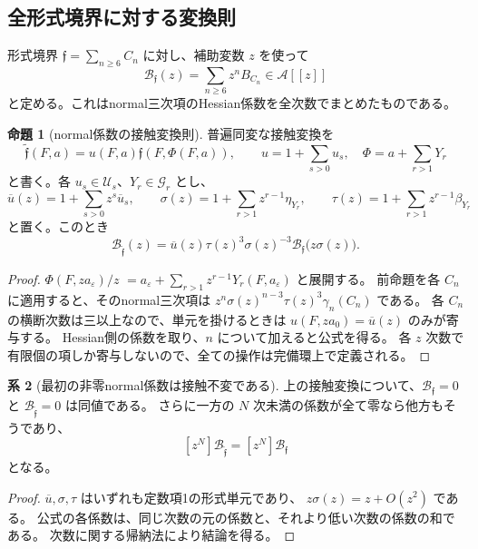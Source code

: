 \documentclass[a4paper,11pt]{ltjsarticle}
\theoremstyle{definition}
\newtheorem{theorem}{命題}[section]
\newtheorem{corollary}[theorem]{系}
\begin{document}
\subsection{全形式境界に対する変換則}

形式境界 $\mathfrak f=\sum_{n\ge6}C_n$ に対し、補助変数 $z$ を使って
\[
 \mathcal B_{\mathfrak f}(z)=\sum_{n\ge6}z^nB_{C_n}\in\mathcal A[[z]]
\]
と定める。これはnormal三次項のHessian係数を全次数でまとめたものである。

\begin{theorem}[normal係数の接触変換則]
\label{thm:v18-normal-contact-law}
普遍同変な接触変換を
\[
 \widetilde{\mathfrak f}(F,a)
   =u(F,a)\mathfrak f(F,\Phi(F,a)),\qquad
 u=1+\sum_{s>0}u_s,\quad
 \Phi=a+\sum_{r>1}Y_r
\]
と書く。各 $u_s\in\mathcal U_s$、$Y_r\in\mathcal G_r$ とし、
\[
 \overline u(z)=1+\sum_{s>0}z^s\overline u_s,
 \qquad
 \sigma(z)=1+\sum_{r>1}z^{r-1}\eta_{Y_r},
 \qquad
 \tau(z)=1+\sum_{r>1}z^{r-1}\beta_{Y_r}
\]
と置く。このとき
\begin{equation}\label{eq:v18-normal-contact-law}
 \boxed{\displaystyle
 \mathcal B_{\widetilde{\mathfrak f}}(z)
 =\overline u(z)\tau(z)^3\sigma(z)^{-3}
      \mathcal B_{\mathfrak f}\bigl(z\sigma(z)\bigr).}
\end{equation}
\end{theorem}

\begin{proof}
$\Phi(F,z a_\varepsilon)/z$
$=a_\varepsilon+\sum_{r>1}z^{r-1}Y_r(F,a_\varepsilon)$ と展開する。
前命題を各 $C_n$ に適用すると、そのnormal三次項は
$z^n\sigma(z)^{n-3}\tau(z)^3\gamma_n(C_n)$ である。
各 $C_n$ の横断次数は三以上なので、単元を掛けるときは
$u(F,z a_0)=\overline u(z)$ のみが寄与する。
Hessian側の係数を取り、$n$ について加えると公式を得る。
各 $z$ 次数で有限個の項しか寄与しないので、全ての操作は完備環上で定義される。
\end{proof}

\begin{corollary}[最初の非零normal係数は接触不変である]
\label{cor:v18-first-normal-contact-invariant}
上の接触変換について、$\mathcal B_{\mathfrak f}=0$ と
$\mathcal B_{\widetilde{\mathfrak f}}=0$ は同値である。
さらに一方の $N$ 次未満の係数が全て零なら他方もそうであり、
\[
 [z^N]\mathcal B_{\widetilde{\mathfrak f}}
 =[z^N]\mathcal B_{\mathfrak f}
\]
となる。
\end{corollary}

\begin{proof}
$\overline u,\sigma,\tau$ はいずれも定数項1の形式単元であり、
$z\sigma(z)=z+O(z^2)$ である。
公式の各係数は、同じ次数の元の係数と、それより低い次数の係数の和である。
次数に関する帰納法により結論を得る。
\end{proof}
\end{document}
